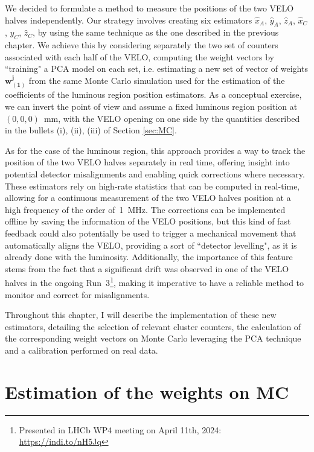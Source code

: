 We decided to formulate a method to measure the positions of the two VELO halves independently. 
Our strategy involves creating six estimators $\hat{x}_A$, $\hat{y}_A$, $\hat{z}_A$, $\hat{x}_C$, $\hat{y}_C$, $\hat{z}_C$, by using the same technique as the one described in the previous chapter. 
We achieve this by considering separately the two set of counters associated with each half of the VELO, computing the weight vectors by ``training" a PCA model on each set, i.e. estimating a new set of vector of weights $\mathbf{w^j_{(1)}}$ from the same Monte Carlo simulation used for the estimation of the coefficients of the luminous region position estimators.
As a conceptual exercise, we can invert the point of view and assume a fixed luminous region position at $(0,0,0)$~mm, with the VELO opening on one side by the quantities described in the bullets (i), (ii), (iii) of Section \ref{sec:MC}. 


As for the case of the luminous region, this approach provides a way to track the position of the two VELO halves separately in real time, offering insight into potential detector misalignments and enabling quick corrections where necessary. These estimators rely on high-rate statistics that can be computed in real-time, allowing for a continuous measurement of the two VELO halves position at a high frequency of the order of~\SI{1}{\mega\hertz}. The corrections can be implemented offline by saving the information of the VELO positions, but this kind of fast feedback could also potentially be used to trigger a mechanical movement that automatically aligns the VELO, providing a sort of ``detector levelling", as it is already done with the luminosity. Additionally, the importance of this feature stems from the fact that a significant drift was observed in one of the VELO halves in the ongoing Run~3\footnote{Presented in LHCb WP4 meeting on April 11th, 2024: \url{https://indi.to/nH5Jq}}, making it imperative to have a reliable method to monitor and correct for misalignments.

Throughout this chapter, I will describe the implementation of these new estimators, detailing the selection of relevant cluster counters, the calculation of the corresponding weight vectors on Monte Carlo leveraging the PCA technique and a calibration performed on real data.



\section{Estimation of the weights on MC}

